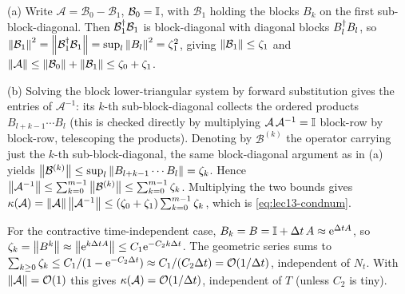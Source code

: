 \begin{solution}
(a) Write $\mathcal A=\mathcal B_0-\mathcal B_1$, $\mathcal B_0=\mathbb{I}$, with $\mathcal B_1$ holding
the blocks $B_k$ on the first sub-block-diagonal. Then $\mathcal B_1^{\dagger}\mathcal B_1$ is
block-diagonal with diagonal blocks $B_l^{\dagger} B_l$, so
$\left\lVert \mathcal B_1 \right\rVert^2=\left\lVert \mathcal B_1^{\dagger}\mathcal B_1 \right\rVert=\sup_l\left\lVert B_l \right\rVert^2=\zeta_1^2$, giving
$\left\lVert \mathcal B_1 \right\rVert\le\zeta_1$ and $\left\lVert \mathcal A \right\rVert\le\left\lVert \mathcal B_0 \right\rVert+\left\lVert \mathcal B_1 \right\rVert
\le\zeta_0+\zeta_1$.

(b) Solving the block lower-triangular system by forward substitution gives the entries of
$\mathcal A^{-1}$: its $k$-th sub-block-diagonal collects the ordered products
$B_{l+k-1}\cdots B_l$ (this is checked directly by multiplying $\mathcal A\,\mathcal A^{-1}=\mathbb{I}$
block-row by block-row, telescoping the products). Denoting by $\mathcal B^{(k)}$ the operator
carrying just the $k$-th sub-block-diagonal, the same block-diagonal argument as in (a) yields
$\left\lVert \mathcal B^{(k)} \right\rVert\le\sup_l\left\lVert B_{l+k-1}\cdots B_l \right\rVert=\zeta_k$. Hence
$\left\lVert \mathcal A^{-1} \right\rVert\le\sum_{k=0}^{m-1}\left\lVert \mathcal B^{(k)} \right\rVert\le\sum_{k=0}^{m-1}\zeta_k$.
Multiplying the two bounds gives $\kappa(\mathcal A)=\left\lVert \mathcal A \right\rVert\left\lVert \mathcal A^{-1} \right\rVert\le
(\zeta_0+\zeta_1)\sum_{k=0}^{m-1}\zeta_k$, which is \eqref{eq:lec13-condnum}.

For the contractive time-independent case, $B_k=B=\mathbb{I}+\Delta t\,A\approx\mathrm{e}^{\Delta t A}$, so
$\zeta_k=\left\lVert B^k \right\rVert\approx\left\lVert \mathrm{e}^{k\Delta t A} \right\rVert\le C_1\mathrm{e}^{-C_2 k\Delta t}$. The geometric
series sums to $\sum_{k\ge0}\zeta_k\le C_1/(1-\mathrm{e}^{-C_2\Delta t})\approx C_1/(C_2\Delta t)=
\mathcal{O}(1/\Delta t)$, independent of $N_t$. With $\left\lVert \mathcal A \right\rVert=\mathcal{O}(1)$ this gives
$\kappa(\mathcal A)=\mathcal{O}(1/\Delta t)$, independent of $T$ (unless $C_2$ is tiny).
\end{solution}

